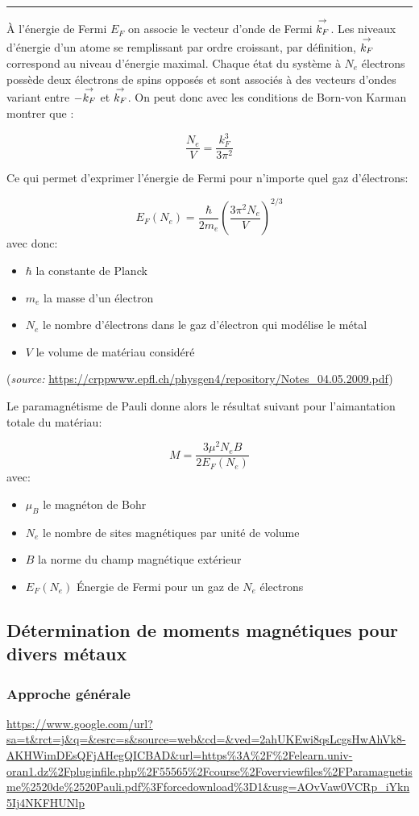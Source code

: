 \documentclass{article}
\begin{document}
\rule{\textwidth}{0.4pt}

À l'énergie de Fermi $E_F$ on associe le vecteur d'onde de Fermi $\overset{\to}{k_F}$. Les niveaux d'énergie d'un atome se remplissant par ordre croissant, par définition, $\overset{\to}{k_F}$ correspond au niveau d'énergie maximal. Chaque état du système à $N_e$ électrons possède deux électrons de spins opposés et sont associés à des vecteurs d'ondes variant entre $-\overset{\to}{k_F}$ et $\overset{\to}{k_F}$. On peut donc avec les conditions de Born-von Karman montrer que :

$$\frac{N_e}{V} = \frac{k_F^3}{3\pi^2}$$

Ce qui permet d'exprimer l'énergie de Fermi pour n'importe quel gaz d'électrons:


    $$E_F(N_e) = \frac{\hbar}{2m_e} \left(\frac{3\pi^2N_e}{V}\right)^{2/3}$$
avec donc:
    \begin{itemize}
        \item $\hbar$ la constante de Planck
        \item $m_e$ la masse d'un électron
        \item $N_e$ le nombre d'électrons dans le gaz d'électron qui modélise le métal
        \item $V$ le volume de matériau considéré
    \end{itemize}
(\emph{source: }\url{https://crppwww.epfl.ch/physgen4/repository/Notes_04.05.2009.pdf})

Le paramagnétisme de Pauli donne alors le résultat suivant pour l'aimantation totale du matériau:

$$M = \frac{3\mu^2 N_e B}{2 E_F(N_e)}$$
avec:
\begin{itemize}
    \item $\mu_B$ le magnéton de Bohr
    \item $N_e$ le nombre de sites magnétiques par unité de volume
    \item $B$ la norme du champ magnétique extérieur
    \item $E_F(N_e)$ Énergie de Fermi pour un gaz de $N_e$ électrons
\end{itemize}

\subsection{Détermination de moments magnétiques pour divers métaux}
\subsubsection{Approche générale}
\url{https://www.google.com/url?sa=t&rct=j&q=&esrc=s&source=web&cd=&ved=2ahUKEwi8qsLcgsHwAhVk8-AKHWimDEsQFjAHegQICBAD&url=https%3A%2F%2Felearn.univ-oran1.dz%2Fpluginfile.php%2F55565%2Fcourse%2Foverviewfiles%2FParamagnetisme%2520de%2520Pauli.pdf%3Fforcedownload%3D1&usg=AOvVaw0VCRp_iYkn5Ij4NKFHUNlp}
\end{document}
